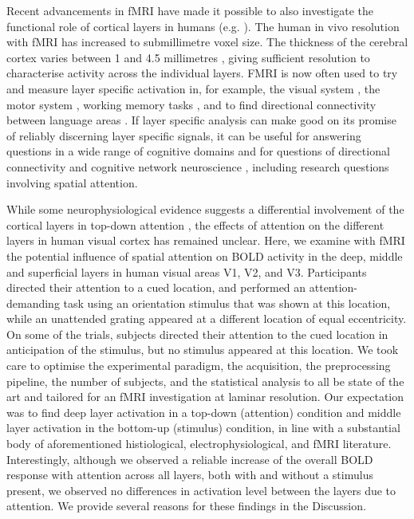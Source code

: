 \documentclass[9pt,lineno]{aperture}
\begin{document}
Recent advancements in fMRI have made it possible to also investigate the functional role of cortical layers in humans (e.g. \citet{Polimeni2010,Maass2014,Kok2016,Lawrence2018,Sharoh2019}). The human in vivo resolution with fMRI has increased to submillimetre voxel size. The thickness of the cerebral cortex varies between 1 and 4.5 millimetres \citep{Zilles1990,Fischl2000}, giving sufficient resolution to characterise activity across the individual layers. FMRI is now often used to try and measure layer specific activation in, for example, the visual system \citep{Muckli2015,Kok2016,Lawrence2018,DeHollander2020}, the motor system \citep{Huber2018}, working memory tasks \citep{Finn2019}, and to find directional connectivity between language areas \citep{Sharoh2019}. If layer specific analysis can make good on its promise of reliably discerning layer specific signals, it can be useful for answering questions in a wide range of cognitive domains \citep{Lawrence2019} and for questions of directional connectivity and cognitive network neuroscience \citep{Huber2020}, including research questions involving spatial attention.

While some neurophysiological evidence suggests a differential involvement of the cortical layers in top-down attention \citep{Nandy2017, VanKerkoerle2017}, the effects of attention on the different layers in human visual cortex has remained unclear. Here, we examine with fMRI the potential influence of spatial attention on BOLD activity in the deep, middle and superficial layers in human visual areas V1, V2, and V3. Participants directed their attention to a cued location, and performed an attention-demanding task using an orientation stimulus that was shown at this location, while an unattended grating appeared at a different location of equal eccentricity. On some of the trials, subjects directed their attention to the cued location in anticipation of the stimulus, but no stimulus appeared at this location. 
We took care to optimise the experimental paradigm, the acquisition, the preprocessing pipeline, the number of subjects, and the statistical analysis to all be state of the art and tailored for an fMRI investigation at laminar resolution. Our expectation was to find deep layer activation in a top-down (attention) condition and middle layer activation in the bottom-up (stimulus) condition, in line with a substantial body of aforementioned histiological, electrophysiological, and fMRI literature.
Interestingly, although we observed a reliable increase of the overall BOLD response with attention across all layers, both with and without a stimulus present, we observed no differences in activation level between the layers due to attention. We provide several reasons for these findings in the Discussion.
\end{document}
